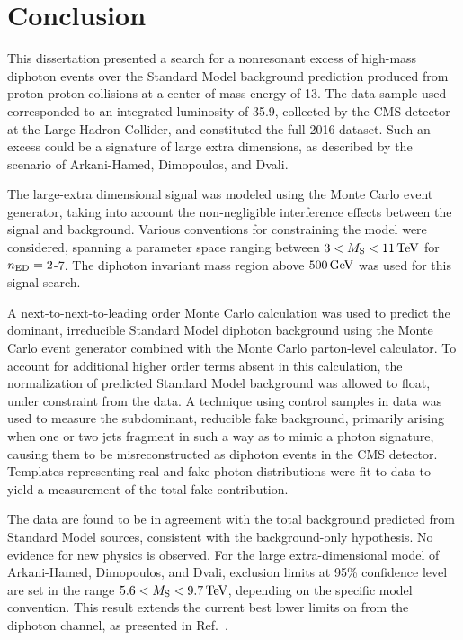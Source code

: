 \chapter{Conclusion}\label{ch:conclusion}

This dissertation presented a search for a nonresonant excess of high-mass diphoton events over the Standard Model background prediction produced from proton-proton collisions at a center-of-mass energy of 13\TeV. The data sample used corresponded to an integrated luminosity of 35.9\fbinv, collected by the CMS detector at the Large Hadron Collider, and constituted the full 2016 dataset. Such an excess could be a signature of large extra dimensions, as described by the scenario of Arkani-Hamed, Dimopoulos, and Dvali. 

The large-extra dimensional signal was modeled using the \SHERPA Monte Carlo event generator, taking into account the non-negligible interference effects between the signal and background.  Various conventions for constraining the model were considered, spanning a parameter space ranging between $3 < M_{\rm S} < 11\,\text{Te\hspace{-.08em}V}$ for $n_{\rm ED}=2$-7. The diphoton invariant mass region above $500\,\text{Ge\hspace{-.08em}V}$ was used for this signal search.

A next-to-next-to-leading order Monte Carlo calculation was used to predict the dominant, irreducible Standard Model diphoton background using the \SHERPA Monte Carlo event generator combined with the \MCFM Monte Carlo parton-level calculator. To account for additional higher order terms absent in this calculation, the normalization of predicted Standard Model background was allowed to float, under constraint from the data. A technique using control samples in data was used to measure the subdominant, reducible fake background, primarily arising when one or two jets fragment in such a way as to mimic a photon signature, causing them to be misreconstructed as diphoton events in the CMS detector. Templates representing real and fake photon distributions were fit to data to yield a measurement of the total fake contribution. 

The data are found to be in agreement with the total background predicted from Standard Model sources, consistent with the background-only hypothesis. No evidence for new physics is observed. For the large extra-dimensional model of Arkani-Hamed, Dimopoulos, and Dvali, exclusion limits at 95\% confidence level are set in the range $5.6 < M_{\rm S} < 9.7\,\text{Te\hspace{-.08em}V}$, depending on the specific model convention.  This result extends the current best lower limits on \Ms from the diphoton channel, as presented in Ref.~\cite{Aaboud:2017yyg}.

